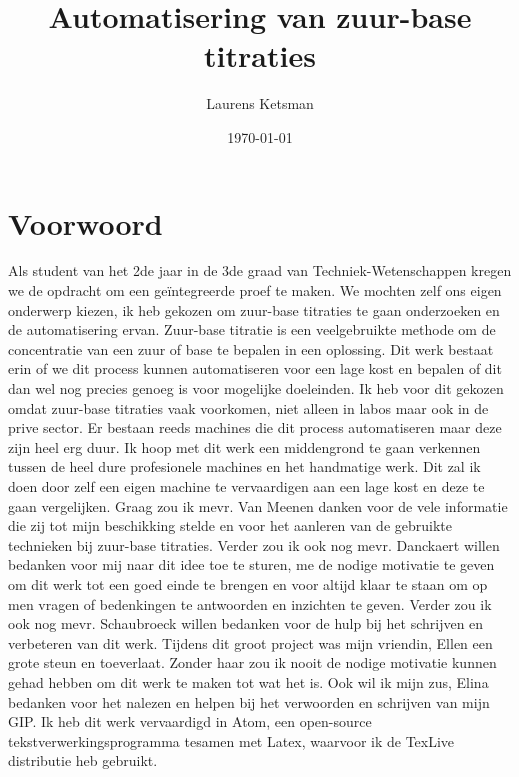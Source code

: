 \documentclass[11pt]{report}
\author{Laurens Ketsman}
\title{Automatisering van zuur-base titraties}
\date{\today}
\newcommand\blankpage{%
    \null
    \thispagestyle{empty}%
    \addtocounter{page}{-1}%
    \newpage}
\newcommand{\pbr}{\hfill\break\hfill\break}
\begin{document}
\clearpage
\maketitle
\thispagestyle{empty}

\blankpage

\tableofcontents
\thispagestyle{empty}

\newpage
\chapter*{Voorwoord}
\thispagestyle{empty}
Als student van het 2de jaar in de 3de graad van Techniek-Wetenschappen kregen we de opdracht om een geïntegreerde proef te maken. We mochten zelf ons eigen onderwerp kiezen, ik heb gekozen om zuur-base titraties te gaan onderzoeken en de automatisering ervan.
\pbr
Zuur-base titratie is een veelgebruikte methode om de concentratie van een zuur of base te bepalen in een oplossing. Dit werk bestaat erin of we dit process kunnen automatiseren voor een lage kost en bepalen of dit dan wel nog precies genoeg is voor mogelijke doeleinden.
\pbr
Ik heb voor dit gekozen omdat zuur-base titraties vaak voorkomen, niet alleen in labos maar ook in de prive sector. Er bestaan reeds machines die dit process automatiseren maar deze zijn heel erg duur. Ik hoop met dit werk een middengrond te gaan verkennen tussen de heel dure profesionele machines en het handmatige werk. Dit zal ik doen door zelf een eigen machine te vervaardigen aan een lage kost en deze te gaan vergelijken.
\pbr
Graag zou ik mevr. Van Meenen danken voor de vele informatie die zij tot mijn beschikking stelde en voor het aanleren van de gebruikte technieken bij zuur-base titraties. Verder zou ik ook nog mevr. Danckaert willen bedanken voor mij naar dit idee toe te sturen, me de nodige motivatie te geven om dit werk tot een goed einde te brengen en voor altijd klaar te staan om op men vragen of bedenkingen te antwoorden en inzichten te geven.
\pbr
Verder zou ik ook nog mevr. Schaubroeck willen bedanken voor de hulp bij het schrijven en verbeteren van dit werk.
\pbr
Tijdens dit groot project was mijn vriendin, Ellen een grote steun en toeverlaat. Zonder haar zou ik nooit de nodige motivatie kunnen gehad hebben om dit werk te maken tot wat het is. Ook wil ik mijn zus, Elina bedanken voor het nalezen en helpen bij het verwoorden en schrijven van mijn GIP.
\pbr
Ik heb dit werk vervaardigd in Atom, een open-source tekstverwerkingsprogramma tesamen met Latex, waarvoor ik de TexLive distributie heb gebruikt.
\end{document}
